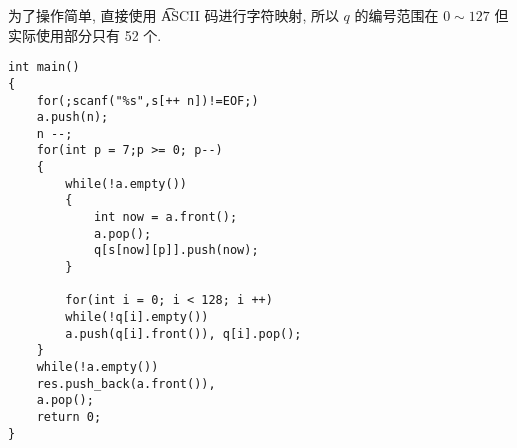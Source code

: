 为了操作简单, 直接使用 \t{ASCII} 码进行字符映射,  所以 $q$  的编号范围在 $0\sim 127$ 但实际使用部分只有 52 个.

\begin{lstlisting}
int main()
{
	for(;scanf("%s",s[++ n])!=EOF;)
	a.push(n);
	n --;
	for(int p = 7;p >= 0; p--)
	{
		while(!a.empty())
		{
			int now = a.front();
			a.pop();
			q[s[now][p]].push(now);
		}
		
		for(int i = 0; i < 128; i ++)
		while(!q[i].empty())
		a.push(q[i].front()), q[i].pop();
	}
	while(!a.empty()) 
	res.push_back(a.front()),
	a.pop();
	return 0;
}
\end{lstlisting}



